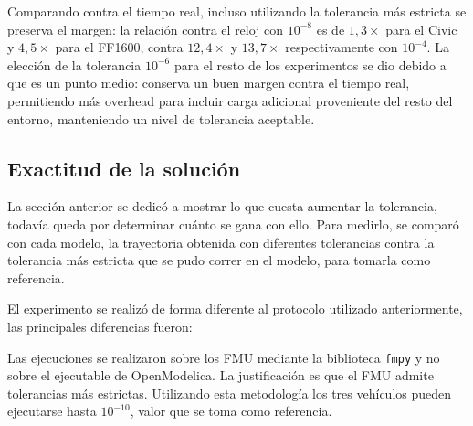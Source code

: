 Comparando contra el tiempo real, incluso utilizando la tolerancia más estricta se preserva el margen: la relación contra el reloj con $10^{-8}$ es de $1{,}3\times$ para el Civic y $4{,}5\times$ para el FF1600, contra $12{,}4\times$ y $13{,}7\times$ respectivamente con $10^{-4}$. La elección de la tolerancia $10^{-6}$ para el resto de los experimentos se dio debido a que es un punto medio: conserva un buen margen contra el tiempo real, permitiendo más overhead para incluir carga adicional proveniente del resto del entorno, manteniendo un nivel de tolerancia aceptable. \\



\subsection{Exactitud de la solución}

La sección anterior se dedicó a mostrar lo que cuesta aumentar la tolerancia, todavía queda por determinar cuánto se gana con ello. Para medirlo, se comparó con cada modelo, la trayectoria obtenida con diferentes tolerancias contra la tolerancia más estricta que se pudo correr en el modelo, para tomarla como referencia. 

El experimento se realizó de forma diferente al protocolo utilizado anteriormente, las principales diferencias fueron:

Las ejecuciones se realizaron sobre los FMU mediante la biblioteca \verb|fmpy| y no sobre el ejecutable de OpenModelica. La justificación es que el FMU admite tolerancias más estrictas. Utilizando esta metodología los tres vehículos pueden ejecutarse hasta  $10^{-10}$, valor que se toma como referencia. 

